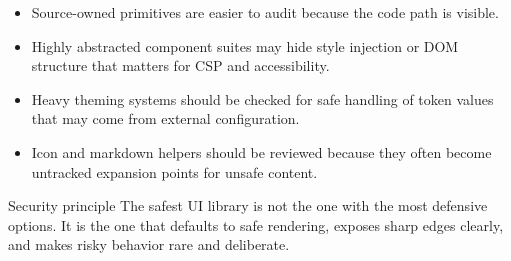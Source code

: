 \begin{itemize}[leftmargin=*, itemsep=0.35em]
  \item Source-owned primitives are easier to audit because the code path is visible.
  \item Highly abstracted component suites may hide style injection or DOM structure that matters for CSP and accessibility.
  \item Heavy theming systems should be checked for safe handling of token values that may come from external configuration.
  \item Icon and markdown helpers should be reviewed because they often become untracked expansion points for unsafe content.
\end{itemize}

\begin{highlightbox}{Security principle}
The safest UI library is not the one with the most defensive options. It is the one that defaults to safe rendering, exposes sharp edges clearly, and makes risky behavior rare and deliberate.
\end{highlightbox}
